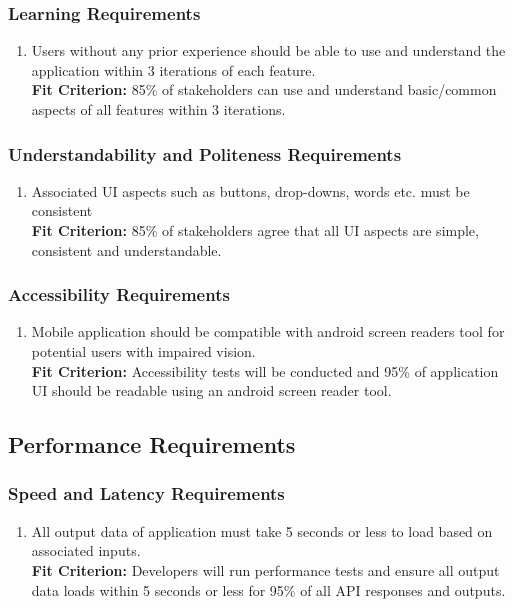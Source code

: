 \documentclass[12pt,letterpaper]{article}
\begin{document}
\subsubsection{Learning Requirements}
\begin{enumerate}[resume*] 
	\item Users without any prior experience should be able to use and understand the application within 3 iterations of each feature.\\
	{\textbf{Fit Criterion:} 85\% of stakeholders can use and understand basic/common aspects of all features within 3 iterations.}
\end{enumerate}

\subsubsection{Understandability and Politeness Requirements}
\begin{enumerate}[resume*] 
	\item Associated UI aspects such as buttons, drop-downs, words etc. must be consistent\\
	{\textbf{Fit Criterion:} 85\% of stakeholders agree that all UI aspects are simple, consistent and understandable.}
\end{enumerate}

\subsubsection{Accessibility Requirements}
\begin{enumerate}[resume*] 
	\item Mobile application should be compatible with android screen readers tool for potential users with impaired vision.\\
	{\textbf{Fit Criterion:} Accessibility tests will be conducted and 95\% of application UI should be readable using an android screen reader tool.}
\end{enumerate}

\subsection{Performance Requirements}
\subsubsection{Speed and Latency Requirements}
\begin{enumerate}[{PE}1.] 
	\item All output data of application must take 5 seconds or less to load based on associated inputs.\\
	{\textbf{Fit Criterion:} Developers will run performance tests and ensure all output data loads within 5 seconds or less for 95\% of all API responses and outputs.}
\end{enumerate}
\end{document}
